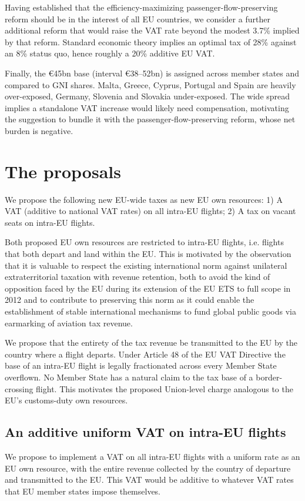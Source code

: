 \documentclass{article}
\begin{document}
Having established that the efficiency-maximizing passenger-flow-preserving reform should be in the interest of all EU countries, we consider a further additional reform that would raise the VAT rate beyond the modest 3.7\% implied by that reform. Standard economic theory implies an optimal tax of 28\% against an 8\% status quo, hence roughly a 20\% additive EU VAT.

Finally, the €45bn base (interval €38–52bn) is assigned across member states and compared to GNI shares. Malta, Greece, Cyprus, Portugal and Spain are heavily over-exposed, Germany, Slovenia and Slovakia under-exposed. The wide spread implies a standalone VAT increase would likely need compensation, motivating the suggestion to bundle it with the passenger-flow-preserving reform, whose net burden is negative.


\section{The proposals}

We propose the following new EU-wide taxes as new EU own resources:
1) A VAT (additive to national VAT rates) on all intra-EU flights;
2) A tax on vacant seats on intra-EU flights.

Both proposed EU own resources are restricted to intra-EU flights, i.e. flights that both depart and land within the EU. This is motivated by the observation that it is valuable to respect the existing international norm against unilateral extraterritorial taxation with revenue retention, both to avoid the kind of opposition faced by the EU during its extension of the EU ETS to full scope in 2012 and to contribute to preserving this norm as it could enable the establishment of stable international mechanisms to fund global public goods via earmarking of aviation tax revenue.

We propose that the entirety of the tax revenue be transmitted to the EU by the country where a flight departs. Under Article 48 of the EU VAT Directive the base of an intra-EU flight is legally fractionated across every Member State overflown. No Member State has a natural claim to the tax base of a border-crossing flight. This motivates the proposed Union-level charge analogous to the EU's customs-duty own resources. 

\subsection{An additive uniform VAT on intra-EU flights}
We propose to implement a VAT on all intra-EU flights with a uniform rate as an EU own resource, with the entire revenue collected by the country of departure and transmitted to the EU. This VAT would be additive to whatever VAT rates that EU member states impose themselves. 
\end{document}
